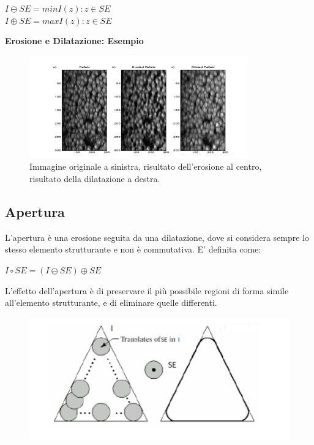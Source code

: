 \begin{center}
    $I \ominus SE = min{I(z):z \in SE}$
    \\$I \oplus SE = max{I(z):z \in SE}$
\end{center}

\newpage
\textbf{Erosione e Dilatazione: Esempio}

\begin{figure}[H]
    \centering
    \includegraphics[width=\linewidth, keepaspectratio]{capitoli/immagini/imgs/erosione-dilatazione-esempio.png}
    \caption*{Immagine originale a sinistra, risultato dell'erosione al centro, risultato della dilatazione a destra.}
\end{figure}

\subsection{Apertura}
L'apertura è una erosione seguita da una dilatazione, dove si considera sempre lo stesso elemento strutturante e non è commutativa.
E' definita come:

\begin{center}
    $I \circ SE = (I \ominus SE) \oplus SE$
\end{center}

L'effetto dell'apertura è di preservare il più possibile regioni di forma simile all'elemento strutturante, e di eliminare quelle
differenti.

\begin{figure}[H]
    \centering
    \includegraphics[width=\linewidth, keepaspectratio]{capitoli/immagini/imgs/apertura.png}
\end{figure}

